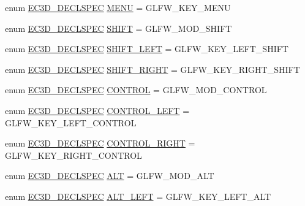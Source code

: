 \begin{DoxyCompactItemize}
\item 
enum \mbox{\hyperlink{_common_8h_aac42573e202ca3dd4d259c81691e2369}{E\+C3\+D\+\_\+\+D\+E\+C\+L\+S\+P\+EC}} \mbox{\hyperlink{classec_1_1_keyboard_a427a782cc88310ca19c3b265d1501258}{M\+E\+NU}} = G\+L\+F\+W\+\_\+\+K\+E\+Y\+\_\+\+M\+E\+NU
\item 
enum \mbox{\hyperlink{_common_8h_aac42573e202ca3dd4d259c81691e2369}{E\+C3\+D\+\_\+\+D\+E\+C\+L\+S\+P\+EC}} \mbox{\hyperlink{classec_1_1_keyboard_a9520324be8993d63fa3f3daf73bcb052}{S\+H\+I\+FT}} = G\+L\+F\+W\+\_\+\+M\+O\+D\+\_\+\+S\+H\+I\+FT
\item 
enum \mbox{\hyperlink{_common_8h_aac42573e202ca3dd4d259c81691e2369}{E\+C3\+D\+\_\+\+D\+E\+C\+L\+S\+P\+EC}} \mbox{\hyperlink{classec_1_1_keyboard_a106acff7ed6b4ee260798a605ecf372f}{S\+H\+I\+F\+T\+\_\+\+L\+E\+FT}} = G\+L\+F\+W\+\_\+\+K\+E\+Y\+\_\+\+L\+E\+F\+T\+\_\+\+S\+H\+I\+FT
\item 
enum \mbox{\hyperlink{_common_8h_aac42573e202ca3dd4d259c81691e2369}{E\+C3\+D\+\_\+\+D\+E\+C\+L\+S\+P\+EC}} \mbox{\hyperlink{classec_1_1_keyboard_a7f2db0bbc56200a09b313aba341486de}{S\+H\+I\+F\+T\+\_\+\+R\+I\+G\+HT}} = G\+L\+F\+W\+\_\+\+K\+E\+Y\+\_\+\+R\+I\+G\+H\+T\+\_\+\+S\+H\+I\+FT
\item 
enum \mbox{\hyperlink{_common_8h_aac42573e202ca3dd4d259c81691e2369}{E\+C3\+D\+\_\+\+D\+E\+C\+L\+S\+P\+EC}} \mbox{\hyperlink{classec_1_1_keyboard_a580639e0252a7949780c6ebe396556f7}{C\+O\+N\+T\+R\+OL}} = G\+L\+F\+W\+\_\+\+M\+O\+D\+\_\+\+C\+O\+N\+T\+R\+OL
\item 
enum \mbox{\hyperlink{_common_8h_aac42573e202ca3dd4d259c81691e2369}{E\+C3\+D\+\_\+\+D\+E\+C\+L\+S\+P\+EC}} \mbox{\hyperlink{classec_1_1_keyboard_af8c2bddcaf311af9ce8f6987f879146f}{C\+O\+N\+T\+R\+O\+L\+\_\+\+L\+E\+FT}} = G\+L\+F\+W\+\_\+\+K\+E\+Y\+\_\+\+L\+E\+F\+T\+\_\+\+C\+O\+N\+T\+R\+OL
\item 
enum \mbox{\hyperlink{_common_8h_aac42573e202ca3dd4d259c81691e2369}{E\+C3\+D\+\_\+\+D\+E\+C\+L\+S\+P\+EC}} \mbox{\hyperlink{classec_1_1_keyboard_a0a094fb07d52018d36258b1a96a005da}{C\+O\+N\+T\+R\+O\+L\+\_\+\+R\+I\+G\+HT}} = G\+L\+F\+W\+\_\+\+K\+E\+Y\+\_\+\+R\+I\+G\+H\+T\+\_\+\+C\+O\+N\+T\+R\+OL
\item 
enum \mbox{\hyperlink{_common_8h_aac42573e202ca3dd4d259c81691e2369}{E\+C3\+D\+\_\+\+D\+E\+C\+L\+S\+P\+EC}} \mbox{\hyperlink{classec_1_1_keyboard_a36ca4a76bfbdb9d9e30cace019cec930}{A\+LT}} = G\+L\+F\+W\+\_\+\+M\+O\+D\+\_\+\+A\+LT
\item 
enum \mbox{\hyperlink{_common_8h_aac42573e202ca3dd4d259c81691e2369}{E\+C3\+D\+\_\+\+D\+E\+C\+L\+S\+P\+EC}} \mbox{\hyperlink{classec_1_1_keyboard_a7f31c587defdb90f3185c6e74396619b}{A\+L\+T\+\_\+\+L\+E\+FT}} = G\+L\+F\+W\+\_\+\+K\+E\+Y\+\_\+\+L\+E\+F\+T\+\_\+\+A\+LT

\end{DoxyCompactItemize}
